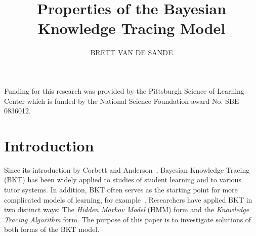 \documentclass{acmlarge-edm}
\title{Properties of the Bayesian Knowledge Tracing Model}
\author{BRETT VAN DE SANDE
\affil{Arizona State University\\bvds@asu.edu}}
\begin{document}


\begin{bottomstuff}
Funding for this research was provided by the Pittsburgh Science of
Learning Center which is funded by the National Science Foundation
award No. SBE-0836012.
\end{bottomstuff}

\maketitle

%
%


\section{Introduction}

Since its introduction by Corbett and 
Anderson~\citeyear{corbett_knowledge_1995}, 
Bayesian Knowledge Tracing (BKT) has been widely applied
to studies of student learning and to various tutor systems.  
In addition, BKT often serves as the starting
%
%
point for more complicated models of learning, for 
example~\cite{baker_improving_2008,lee_impact_2012}.
Researchers have applied BKT in two distinct ways:  
The {\em Hidden Markov Model} (HMM) form and the 
{\em Knowledge Tracing Algorithm} form.
The purpose of this paper is to investigate solutions of both
forms of the BKT model.
\end{document}
